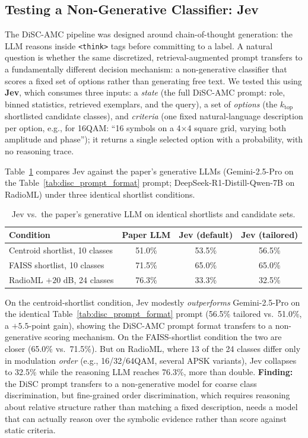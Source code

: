 \subsection{Testing a Non-Generative Classifier: Jev}
\label{sec:jev}

The DiSC-AMC pipeline was designed around chain-of-thought generation: the LLM reasons inside \texttt{<think>} tags before committing to a label. A natural question is whether the same discretized, retrieval-augmented prompt transfers to a fundamentally different decision mechanism: a non-generative classifier that scores a fixed set of options rather than generating free text. We tested this using \textbf{Jev}, which consumes three inputs: a \emph{state} (the full DiSC-AMC prompt: role, binned statistics, retrieved exemplars, and the query), a set of \emph{options} (the $k_{\mathrm{top}}$ shortlisted candidate classes), and \emph{criteria} (one fixed natural-language description per option, e.g., for 16QAM: ``16 symbols on a 4$\times$4 square grid, varying both amplitude and phase''); it returns a single selected option with a probability, with no reasoning trace.

Table~\ref{tab:jev_results} compares Jev against the paper's generative LLMs (Gemini-2.5-Pro on the Table~\ref{tab:disc_prompt_format} prompt; DeepSeek-R1-Distill-Qwen-7B on RadioML) under three identical shortlist conditions.

\begin{table}[htbp]
\centering
\caption{Jev vs.\ the paper's generative LLM on identical shortlists and candidate sets.}
\label{tab:jev_results}
\begin{tabular}{lccc}
\toprule
Condition & Paper LLM & Jev (default) & Jev (tailored) \\
\midrule
Centroid shortlist, 10 classes & 51.0\% & 53.5\% & 56.5\% \\
FAISS shortlist, 10 classes & 71.5\% & 65.0\% & 65.0\% \\
RadioML $+20$ dB, 24 classes & 76.3\% & 33.3\% & 32.5\% \\
\bottomrule
\end{tabular}
\end{table}

On the centroid-shortlist condition, Jev modestly \emph{outperforms} Gemini-2.5-Pro on the identical Table~\ref{tab:disc_prompt_format} prompt (56.5\% tailored vs.\ 51.0\%, a $+5.5$-point gain), showing the DiSC-AMC prompt format transfers to a non-generative scoring mechanism. On the FAISS-shortlist condition the two are closer (65.0\% vs.\ 71.5\%). But on RadioML, where 13 of the 24 classes differ only in modulation \emph{order} (e.g., 16/32/64QAM, several APSK variants), Jev collapses to 32.5\% while the reasoning LLM reaches 76.3\%, more than double. \textbf{Finding:} the DiSC prompt transfers to a non-generative model for coarse class discrimination, but fine-grained order discrimination, which requires reasoning about relative structure rather than matching a fixed description, needs a model that can actually reason over the symbolic evidence rather than score against static criteria.


